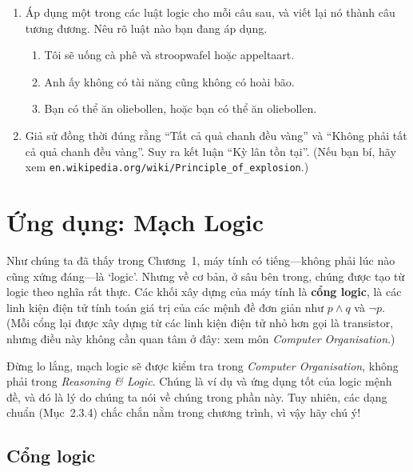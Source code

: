 \begin{enumerate}
\item[12.] Áp dụng một trong các luật logic cho mỗi câu sau, và viết lại nó thành câu tương đương. Nêu rõ luật nào bạn đang áp dụng.
\begin{enumerate}[label=\alph*)]
\item Tôi sẽ uống cà phê và stroopwafel hoặc appeltaart.
\item Anh ấy không có tài năng cũng không có hoài bão.
\item Bạn có thể ăn oliebollen, hoặc bạn có thể ăn oliebollen.
\end{enumerate}

\item[13.] Giả sử đồng thời đúng rằng ``Tất cả quả chanh đều vàng'' và ``Không phải tất cả quả chanh đều vàng''. Suy ra kết luận ``Kỳ lân tồn tại''. (Nếu bạn bí, hãy xem \texttt{en.wikipedia.org/wiki/Principle\_of\_explosion}.)
\end{enumerate}

\section{Ứng dụng: Mạch Logic}

Như chúng ta đã thấy trong Chương~1, máy tính có tiếng---không phải lúc nào cũng xứng đáng---là `logic'. Nhưng về cơ bản, ở sâu bên trong, chúng được tạo từ logic theo nghĩa rất thực. Các khối xây dựng của máy tính là \textbf{cổng logic}, là các linh kiện điện tử tính toán giá trị của các mệnh đề đơn giản như $p \land q$ và $\lnot p$. (Mỗi cổng lại được xây dựng từ các linh kiện điện tử nhỏ hơn gọi là transistor, nhưng điều này không cần quan tâm ở đây: xem môn \emph{Computer Organisation}.)

\begin{infobox}
Đừng lo lắng, mạch logic sẽ được kiểm tra trong \emph{Computer Organisation}, không phải trong \emph{Reasoning \& Logic}. Chúng là ví dụ và ứng dụng tốt của logic mệnh đề, và đó là lý do chúng ta nói về chúng trong phần này. Tuy nhiên, các dạng chuẩn (Mục~2.3.4) chắc chắn nằm trong chương trình, vì vậy hãy chú ý!
\end{infobox}

\subsection{Cổng logic}

